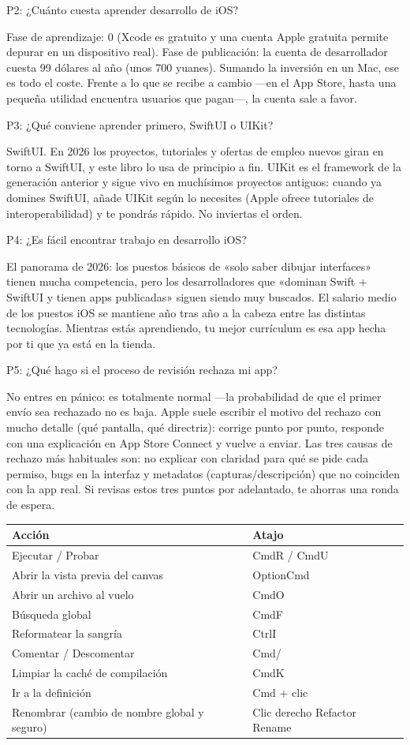 P2: ¿Cuánto cuesta aprender desarrollo de iOS?

Fase de aprendizaje: 0 (Xcode es gratuito y una cuenta Apple gratuita permite depurar en un dispositivo real). Fase de publicación: la cuenta de desarrollador cuesta 99 dólares al año (unos 700 yuanes). Sumando la inversión en un Mac, ese es todo el coste. Frente a lo que se recibe a cambio —en el App Store, hasta una pequeña utilidad encuentra usuarios que pagan—, la cuenta sale a favor.

P3: ¿Qué conviene aprender primero, SwiftUI o UIKit?

SwiftUI. En 2026 los proyectos, tutoriales y ofertas de empleo nuevos giran en torno a SwiftUI, y este libro lo usa de principio a fin. UIKit es el framework de la generación anterior y sigue vivo en muchísimos proyectos antiguos: cuando ya domines SwiftUI, añade UIKit según lo necesites (Apple ofrece tutoriales de interoperabilidad) y te pondrás rápido. No inviertas el orden.

P4: ¿Es fácil encontrar trabajo en desarrollo iOS?

El panorama de 2026: los puestos básicos de «solo saber dibujar interfaces» tienen mucha competencia, pero los desarrolladores que «dominan Swift + SwiftUI y tienen apps publicadas» siguen siendo muy buscados. El salario medio de los puestos iOS se mantiene año tras año a la cabeza entre las distintas tecnologías. Mientras estás aprendiendo, tu mejor currículum es esa app hecha por ti que ya está en la tienda.

P5: ¿Qué hago si el proceso de revisión rechaza mi app?

No entres en pánico: es totalmente normal —la probabilidad de que el primer envío sea rechazado no es baja. Apple suele escribir el motivo del rechazo con mucho detalle (qué pantalla, qué directriz): corrige punto por punto, responde con una explicación en App Store Connect y vuelve a enviar. Las tres causas de rechazo más habituales son: no explicar con claridad para qué se pide cada permiso, bugs en la interfaz y metadatos (capturas/descripción) que no coinciden con la app real. Si revisas estos tres puntos por adelantado, te ahorras una ronda de espera.


\begin{center}
\begin{tabularx}{\linewidth}{|X|X|}
\hline
\textbf{Acción} & \textbf{Atajo} \tabularnewline
\hline
Ejecutar / Probar & CmdR / CmdU \tabularnewline
Abrir la vista previa del canvas & OptionCmd \tabularnewline
Abrir un archivo al vuelo & CmdO \tabularnewline
Búsqueda global & CmdF \tabularnewline
Reformatear la sangría & CtrlI \tabularnewline
Comentar / Descomentar & Cmd/ \tabularnewline
Limpiar la caché de compilación & CmdK \tabularnewline
Ir a la definición & Cmd + clic \tabularnewline
Renombrar (cambio de nombre global y seguro) & Clic derecho Refactor Rename \tabularnewline
\hline
\end{tabularx}
\end{center}

